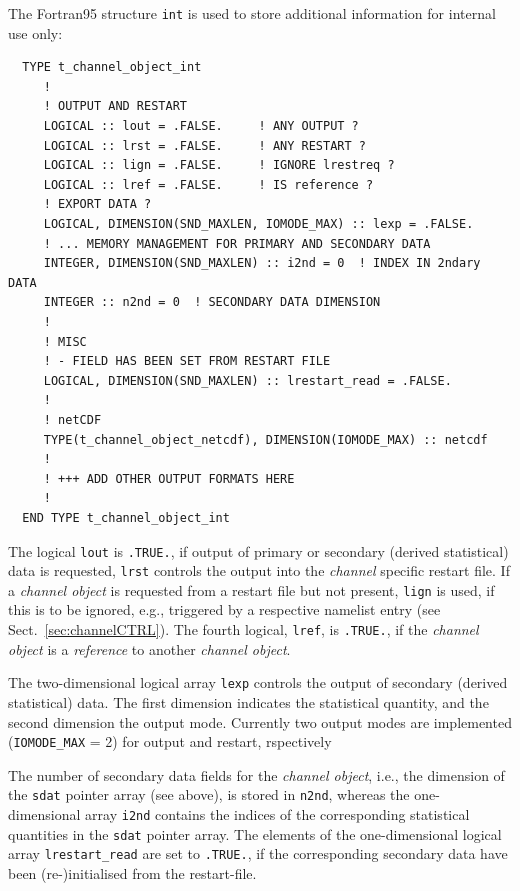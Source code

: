 \documentclass[twoside]{article}
\begin{document}
The Fortran95 structure {\tt int} is used to store additional information for
internal use only:
\begin{verbatim}
  TYPE t_channel_object_int
     !
     ! OUTPUT AND RESTART
     LOGICAL :: lout = .FALSE.     ! ANY OUTPUT ?
     LOGICAL :: lrst = .FALSE.     ! ANY RESTART ?
     LOGICAL :: lign = .FALSE.     ! IGNORE lrestreq ?
     LOGICAL :: lref = .FALSE.     ! IS reference ?
     ! EXPORT DATA ?
     LOGICAL, DIMENSION(SND_MAXLEN, IOMODE_MAX) :: lexp = .FALSE.
     ! ... MEMORY MANAGEMENT FOR PRIMARY AND SECONDARY DATA
     INTEGER, DIMENSION(SND_MAXLEN) :: i2nd = 0  ! INDEX IN 2ndary DATA
     INTEGER :: n2nd = 0  ! SECONDARY DATA DIMENSION
     !
     ! MISC
     ! - FIELD HAS BEEN SET FROM RESTART FILE
     LOGICAL, DIMENSION(SND_MAXLEN) :: lrestart_read = .FALSE.
     !
     ! netCDF
     TYPE(t_channel_object_netcdf), DIMENSION(IOMODE_MAX) :: netcdf
     !
     ! +++ ADD OTHER OUTPUT FORMATS HERE
     !
  END TYPE t_channel_object_int
\end{verbatim}
The logical {\tt lout} is {\tt .TRUE.}, if output of primary or secondary
(derived statistical) data is requested, {\tt lrst} controls the output into
the {\it channel} specific restart file. If a {\it channel object} is
requested from a restart file but not present, {\tt lign} is used, if this is
to be ignored, e.g., triggered by a respective namelist entry
(see Sect.~\ref{sec:channelCTRL}).
The fourth logical, {\tt lref}, is {\tt .TRUE.},
if the {\it channel object} is a {\it reference} to another
{\it channel object}.

The two-dimensional logical array {\tt lexp} controls the output of secondary
(derived statistical) data. The first dimension indicates the statistical
quantity, and the second dimension the output mode. Currently
two output modes are implemented ({\tt IOMODE\_MAX} = 2)
for output and restart, rspectively

The number of secondary data fields for the {\it channel object}, i.e., the
dimension of the {\tt sdat} pointer array (see above), is stored in
{\tt n2nd}, whereas the one-dimensional array {\tt i2nd} contains the indices
of the corresponding statistical quantities in the {\tt sdat} pointer array.
The elements of the one-dimensional logical array {\tt lrestart\_read} are
set to {\tt .TRUE.}, if the corresponding secondary data have been
(re-)initialised from the restart-file.
\end{document}
